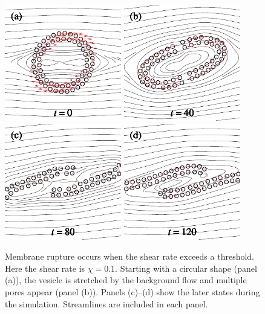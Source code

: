 \documentclass[lineno]{jfm}
\begin{document}
\begin{figure}
\centering
\includegraphics[height=2in]{N58_rupt_0.pdf}
\includegraphics[height=2in]{N58_rupt_200.pdf}
\\
\includegraphics[height=2in]{N58_rupt_400.pdf}
\includegraphics[height=2in]{N58_rupt_600.pdf}
  \caption{\label{figure8} Membrane rupture occurs when the shear rate
  exceeds a threshold. Here the shear rate is $\chi = 0.1$.  Starting
  with a circular shape (panel (a)), the vesicle is stretched by the
  background flow and multiple pores appear (panel (b)).  Panels
  (c)--(d) show the later states during the simulation. Streamlines are
  included in each panel.}
\end{figure}
\end{document}
